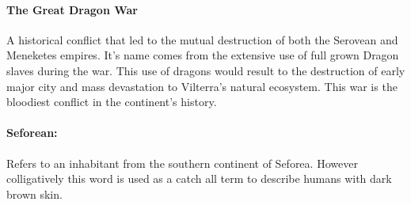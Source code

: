 \documentclass[../main.tex]{subfiles}
\begin{document}
\paragraph{The Great Dragon War }
A historical conflict that led to the mutual destruction of both the Serovean and Meneketes empires. It’s name comes from the extensive use of full grown Dragon slaves during the war. This use of dragons would result to the destruction of early major city and mass devastation to Vilterra’s natural ecosystem. This war is the bloodiest conflict in the continent’s history.
\paragraph{Seforean: }
Refers to an inhabitant from the southern continent of Seforea. However colligatively this word is used as a catch all term to describe humans with dark brown skin.
\end{document}
